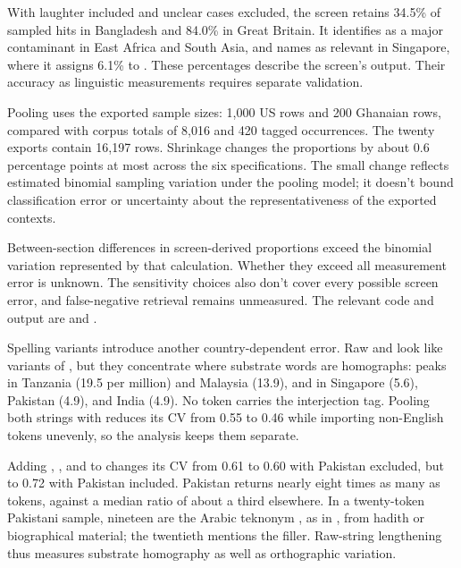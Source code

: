 \documentclass[12pt]{article}
\begin{document}
With laughter included and unclear cases excluded, the screen retains
34.5\% of sampled hits in Bangladesh and 84.0\% in Great Britain.
It identifies  as a major contaminant in East Africa and
South Asia, and names as relevant in Singapore, where it assigns 6.1\%
to . These percentages describe the screen's output.
Their accuracy as linguistic measurements requires separate validation.

Pooling uses the exported sample sizes: 1,000 US rows and 200 Ghanaian
rows, compared with corpus totals of 8,016 and 420 tagged occurrences.
The twenty exports contain 16,197 rows. Shrinkage changes the proportions
by about 0.6 percentage points at most across the six specifications.
The small change reflects estimated binomial sampling variation under
the pooling model; it doesn't bound classification error or uncertainty
about the representativeness of the exported contexts.

Between-section differences in screen-derived proportions exceed the
binomial variation represented by that calculation. Whether they exceed
all measurement error is unknown. The sensitivity choices also don't
cover every possible screen error, and false-negative retrieval remains
unmeasured. The relevant code and output are
 and
.

Spelling variants introduce another country-dependent error. Raw  and  look like variants of , but they concentrate where substrate words are homographs:  peaks in Tanzania (19.5 per million) and Malaysia (13.9), and  in Singapore (5.6), Pakistan (4.9), and India (4.9). No  token carries the interjection tag. Pooling both strings with  reduces its CV from 0.55 to 0.46 while importing non-English tokens unevenly, so the analysis keeps them separate.

Adding , , and  to  changes its CV from 0.61 to 0.60 with Pakistan excluded, but to 0.72 with Pakistan included. Pakistan returns nearly eight times as many  as  tokens, against a median ratio of about a third elsewhere. In a twenty-token Pakistani sample, nineteen are the Arabic teknonym , as in , from hadith or biographical material; the twentieth mentions the filler. Raw-string lengthening thus measures substrate homography as well as orthographic variation.
\end{document}

